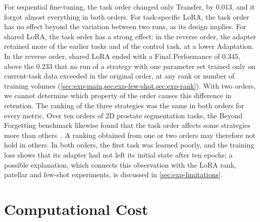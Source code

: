 For sequential fine-tuning, the task order changed only Transfer, by 0.013, and it forgot almost everything in both orders.
For task-specific LoRA, the task order has no effect beyond the variation between two runs, as its design implies.
For shared LoRA, the task order has a strong effect: in the reverse order, the adapter retained more of the earlier tasks and of the control task, at a lower Adaptation.
In the reverse order, shared LoRA ended with a Final Performance of 0.345, above the 0.233 that no run of a strategy with one parameter set trained only on current-task data exceeded in the original order, at any rank or number of training volumes (\cref{sec:exp-main,sec:exp-few-shot,sec:exp-rank}).
With two orders, we cannot determine which property of the order causes this difference in retention.
The ranking of the three strategies was the same in both orders for every metric.
Over ten orders of 2D prostate segmentation tasks, the Beyond Forgetting benchmark likewise found that the task order affects some strategies more than others~\cite[Sec.~4.4]{wang2026beyondforgetting}.
A ranking obtained from one or two orders may therefore not hold in others.
In both orders, the first task was learned poorly, and the training loss shows that its adapter had not left its initial state after ten epochs; a possible explanation, which connects this observation with the LoRA rank, patellar and few-shot experiments, is discussed in \cref{sec:exp-limitations}.

\section{Computational Cost}
\label{sec:exp-compute}

\begin{table}[tb]
\centering
\caption[Measured cost of the strategies]{Measured cost of the strategies in the comparison (full training split, original task order, one NVIDIA A100 40\,GB). Trainable param.: parameters set as trainable (\cref{sec:method-adaptation}). Epoch: mean time of one training epoch, including validation. Evaluation: median time per test volume, including data loading and text encoding. Peak GPU mem.: maximum over training and evaluation.}
\label{tab:ch6_compute}

\end{table}

